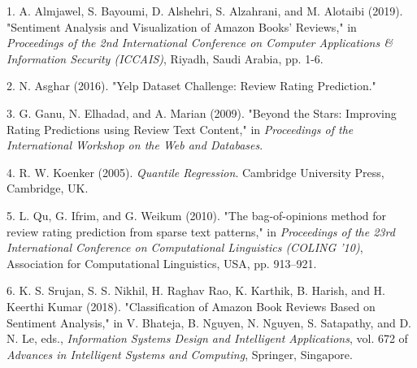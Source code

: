 \documentclass[12pt]{article}
\numberwithin{equation}{section}
\begin{document}
%
%


%
%
\clearpage  

\begin{thebibliography}{9}
	

	
	1. A. Almjawel, S. Bayoumi, D. Alshehri, S. Alzahrani, and M. Alotaibi (2019). "Sentiment Analysis and Visualization of Amazon Books' Reviews," in \emph{Proceedings of the 2nd International Conference on Computer Applications \& Information Security (ICCAIS)}, Riyadh, Saudi Arabia, pp. 1-6.
	
	2. N. Asghar (2016). "Yelp Dataset Challenge: Review Rating Prediction."
	
	3. G. Ganu, N. Elhadad, and A. Marian (2009). "Beyond the Stars: Improving Rating Predictions using Review Text Content," in \emph{Proceedings of the International Workshop on the Web and Databases}.
	
	4. R. W. Koenker (2005). \emph{Quantile Regression}. Cambridge University Press, Cambridge, UK.
	
	5. L. Qu, G. Ifrim, and G. Weikum (2010). "The bag-of-opinions method for review rating prediction from sparse text patterns," in \emph{Proceedings of the 23rd International Conference on Computational Linguistics (COLING '10)}, Association for Computational Linguistics, USA, pp. 913–921.
	
	6. K. S. Srujan, S. S. Nikhil, H. Raghav Rao, K. Karthik, B. Harish, and H. Keerthi Kumar (2018). "Classification of Amazon Book Reviews Based on Sentiment Analysis," in V. Bhateja, B. Nguyen, N. Nguyen, S. Satapathy, and D. N. Le, eds., \emph{Information Systems Design and Intelligent Applications}, vol. 672 of \emph{Advances in Intelligent Systems and Computing}, Springer, Singapore.
	
\end{thebibliography}
\end{document}
